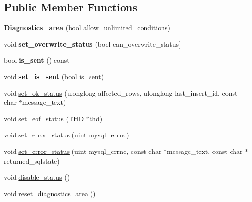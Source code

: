 \subsection*{Public Member Functions}
\begin{DoxyCompactItemize}
\item 
\mbox{\label{classDiagnostics__area_a4a214a30f5e2af4b53f724335a2b9c53}} 
{\bfseries Diagnostics\+\_\+area} (bool allow\+\_\+unlimited\+\_\+conditions)
\item 
\mbox{\label{classDiagnostics__area_a8f1beb4132ca08d855b4e5d9b78d61fa}} 
void {\bfseries set\+\_\+overwrite\+\_\+status} (bool can\+\_\+overwrite\+\_\+status)
\item 
\mbox{\label{classDiagnostics__area_a21c931e44b8b623bc0b0bfbe4f264411}} 
bool {\bfseries is\+\_\+sent} () const
\item 
\mbox{\label{classDiagnostics__area_a431c427c8b396ae3330fadf52a37a262}} 
void {\bfseries set\+\_\+is\+\_\+sent} (bool is\+\_\+sent)
\item 
void \mbox{\hyperlink{classDiagnostics__area_a3d93eac8000515aa108fea036dca03fb}{set\+\_\+ok\+\_\+status}} (ulonglong affected\+\_\+rows, ulonglong last\+\_\+insert\+\_\+id, const char $\ast$message\+\_\+text)
\item 
void \mbox{\hyperlink{classDiagnostics__area_a3b85cb8d8c79391a1612b1f03a92d7d6}{set\+\_\+eof\+\_\+status}} (T\+HD $\ast$thd)
\item 
void \mbox{\hyperlink{classDiagnostics__area_adf14f5f9230b8675747efcf6ec797657}{set\+\_\+error\+\_\+status}} (uint mysql\+\_\+errno)
\item 
void \mbox{\hyperlink{classDiagnostics__area_acb25d767eace0d90c9abd0bb2f39deed}{set\+\_\+error\+\_\+status}} (uint mysql\+\_\+errno, const char $\ast$message\+\_\+text, const char $\ast$returned\+\_\+sqlstate)
\item 
void \mbox{\hyperlink{classDiagnostics__area_a3ca17737803af475b84ff53f1409adf2}{disable\+\_\+status}} ()
\item 
void \mbox{\hyperlink{classDiagnostics__area_a81ad7fce5478744c6e2a5435330996d2}{reset\+\_\+diagnostics\+\_\+area}} ()
\item 
\mbox{\label{classDiagnostics__area_ad5104578dfb7cc5183f9d2da777538ed}} 

\end{DoxyCompactItemize}
